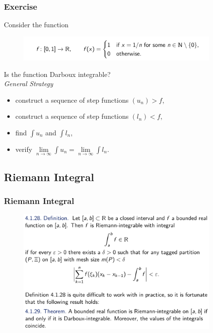 \documentclass[10pt, t]{beamer}
\newcommand{\nullspace}{~\\[15pt]}
\begin{document}
\begin{frame}
    \frametitle{Exercise}
    Consider the function
    \begin{figure}[H]
        \centering
        \includegraphics[width=0.9\textwidth]{2020-12-02-12-24-56.png}
    \end{figure}
    Is the function Darboux integrable?
    \nullspace\pause
    \textit{General Strategy}\\
    \begin{itemize}
        \item construct a sequence of step functions $(u_n)>f$,
        \item construct a sequence of step functions $(l_n)<f$,
        \item find $\int u_n$ and $\int l_n$,
        \item verify $\underset{n\to \infty}{\lim}\int u_n = \underset{n\to \infty}{\lim}\int l_n$.
    \end{itemize}

\end{frame}

\subsection{Riemann Integral}
\begin{frame}
    \frametitle{Riemann Integral}
    \begin{figure}[H]
        \centering
        \includegraphics[width=0.9\textwidth]{2020-12-02-12-12-35.png}
    \end{figure}
\end{frame}
\end{document}

